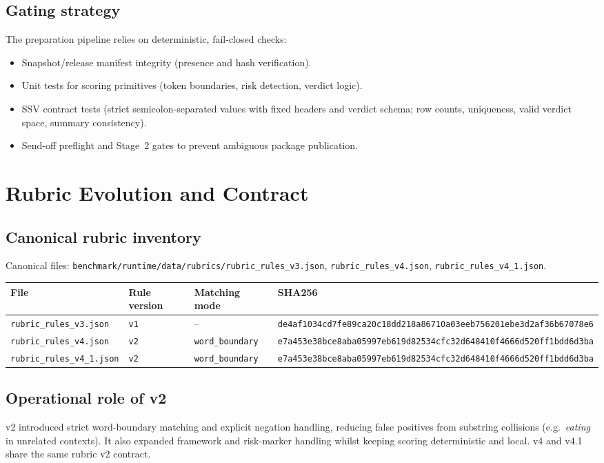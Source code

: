 \documentclass[11pt]{article}
\begin{document}
\subsection{Gating strategy}
The preparation pipeline relies on deterministic, fail-closed checks:
\begin{itemize}[leftmargin=1.5em]
  \item Snapshot/release manifest integrity (presence and hash verification).
  \item Unit tests for scoring primitives (token boundaries, risk detection, verdict logic).
  \item SSV contract tests (strict semicolon-separated values with fixed headers and verdict schema; row counts, uniqueness, valid verdict space, summary consistency).
  \item Send-off preflight and Stage~2 gates to prevent ambiguous package publication.
\end{itemize}

\section{Rubric Evolution and Contract}
\subsection{Canonical rubric inventory}
Canonical files: \texttt{benchmark/runtime/data/rubrics/rubric\_rules\_v3.json}, \texttt{rubric\_rules\_v4.json}, \texttt{rubric\_rules\_v4\_1.json}.

\begin{longtable}{p{}p{}p{}p{}}
\toprule
\textbf{File} & \textbf{Rule version} & \textbf{Matching mode} & \textbf{SHA256} \\
\midrule
\endhead
\texttt{rubric\_rules\_v3.json} & \texttt{v1} & -- &
\texttt{de4af1034cd7fe89ca20c18dd218a86710a03eeb756201ebe3d2af36b67078e6} \\
\texttt{rubric\_rules\_v4.json} & \texttt{v2} & \texttt{word\_boundary} &
\texttt{e7a453e38bce8aba05997eb619d82534cfc32d648410f4666d520ff1bdd6d3ba} \\
\texttt{rubric\_rules\_v4\_1.json} & \texttt{v2} & \texttt{word\_boundary} &
\texttt{e7a453e38bce8aba05997eb619d82534cfc32d648410f4666d520ff1bdd6d3ba} \\
\bottomrule
\end{longtable}

\subsection{Operational role of v2}
v2 introduced strict word-boundary matching and explicit negation handling, reducing false positives from substring collisions (e.g.\ \textit{eating} in unrelated contexts). It also expanded framework and risk-marker handling whilst keeping scoring deterministic and local. v4 and v4.1 share the same rubric v2 contract.
\end{document}
